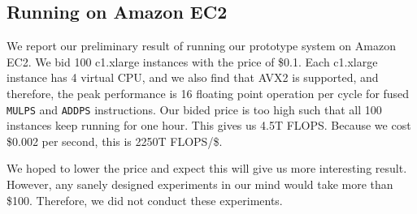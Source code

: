 \documentclass[11pt]{article}
\begin{document}
\subsection{Running on Amazon EC2}

We report our preliminary result of running our prototype
system on Amazon EC2. We bid 100 c1.xlarge instances with 
the price of \$0.1. Each c1.xlarge instance has
4 virtual CPU, and we also find that AVX2 is supported, and
therefore, the peak performance is 16 floating point
operation per cycle for fused \texttt{MULPS} and \texttt{ADDPS} instructions.
Our bided price is too high such that all 100 instances
keep running for one hour. This gives us 4.5T FLOPS.
Because we cost \$0.002 per second, this is 2250T FLOPS/\$.

We hoped to lower the price and expect this will give us
more interesting result. However, any sanely designed
experiments in our mind would take more than \$100. Therefore,
we did not conduct these experiments.



\end{document}
